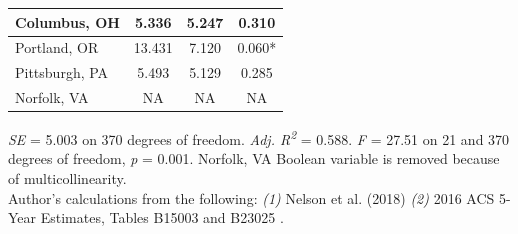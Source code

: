 \documentclass[paper=letter, fontsize=12pt]{scrartcl} %
\begin{document}
\begin{table}
\begin{center}
\begin{tabular}{|| l | c c c ||}
				\hline 
				Columbus, OH & 5.336 & 5.247 & 0.310\\
				\hline 
				Portland, OR & 13.431 & 7.120 & 0.060*\\
				\hline 
				Pittsburgh, PA & 5.493 & 5.129 & 0.285\\
				\hline 
				Norfolk, VA & NA & NA & NA\\
				\hline 
			\end{tabular}
		\end{center}
		\textit{SE} = 5.003 on 370 degrees of freedom. \textit{Adj. R\textsuperscript{2}} = 0.588. \textit{F} = 27.51 on 21 and 370 degrees of freedom, \textit{p} = 0.001. Norfolk, VA Boolean variable is removed because of multicollinearity.\\
		Author's calculations from the following: \textit{(1)} Nelson et al. (2018) \cite{richmond} \textit{(2)} 2016 ACS 5-Year Estimates, Tables B15003 and B23025 \cite{acs16}.
	\end{table}
	
\end{document}
